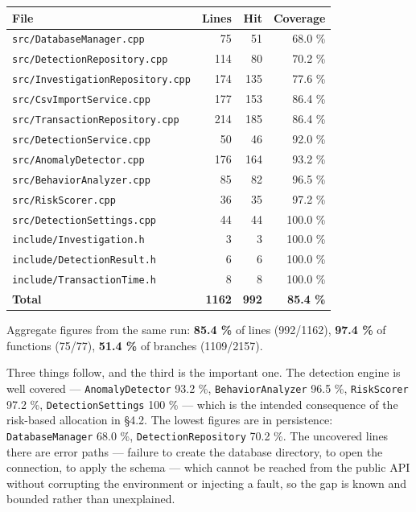 \documentclass[
  12pt,
]{report}
\begin{document}
\begin{longtable}[]{@{}lrrr@{}}
\toprule\noalign{}
File & Lines & Hit & Coverage \\
\midrule\noalign{}
\endhead
\bottomrule\noalign{}
\endlastfoot
\texttt{src/\allowbreak{}DatabaseManager.cpp} & 75 & 51 & 68.0 \% \\
\texttt{src/\allowbreak{}Detection\-Repository.cpp} & 114 & 80 & 70.2 \% \\
\texttt{src/\allowbreak{}Investigation\-Repository.cpp} & 174 & 135 & 77.6 \% \\
\texttt{src/\allowbreak{}Csv\-Import\-Service.cpp} & 177 & 153 & 86.4 \% \\
\texttt{src/\allowbreak{}Transaction\-Repository.cpp} & 214 & 185 & 86.4 \% \\
\texttt{src/\allowbreak{}Detection\-Service.cpp} & 50 & 46 & 92.0 \% \\
\texttt{src/\allowbreak{}AnomalyDetector.cpp} & 176 & 164 & 93.2 \% \\
\texttt{src/\allowbreak{}Behavior\-Analyzer.cpp} & 85 & 82 & 96.5 \% \\
\texttt{src/\allowbreak{}RiskScorer.cpp} & 36 & 35 & 97.2 \% \\
\texttt{src/\allowbreak{}Detection\-Settings.cpp} & 44 & 44 & 100.0 \% \\
\texttt{include/\allowbreak{}Investigation.h} & 3 & 3 & 100.0 \% \\
\texttt{include/\allowbreak{}DetectionResult.h} & 6 & 6 & 100.0 \% \\
\texttt{include/\allowbreak{}TransactionTime.h} & 8 & 8 & 100.0 \% \\
\textbf{Total} & \textbf{1162} & \textbf{992} & \textbf{85.4 \%} \\
\end{longtable}

Aggregate figures from the same run: \textbf{85.4 \%} of lines
(992/1162), \textbf{97.4 \%} of functions (75/77), \textbf{51.4 \%} of
branches (1109/2157).

Three things follow, and the third is the important one. The detection
engine is well covered --- \texttt{AnomalyDetector} 93.2 \%,
\texttt{Behavior\-Analyzer} 96.5 \%, \texttt{RiskScorer} 97.2 \%,
\texttt{Detection\-Settings} 100 \% --- which is the intended consequence
of the risk-based allocation in §4.2. The lowest figures are in
persistence: \texttt{DatabaseManager} 68.0 \%,
\texttt{Detection\-Repository} 70.2 \%. The uncovered lines there are
error paths --- failure to create the database directory, to open the
connection, to apply the schema --- which cannot be reached from the
public API without corrupting the environment or injecting a fault, so
the gap is known and bounded rather than unexplained.
\end{document}
